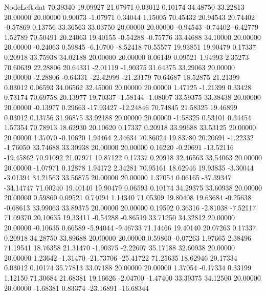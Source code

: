 \begin{filecontents}{NodeLeft.dat}
  70.39340   19.09927   21.07971     0.03012    0.10174   34.48750   33.22813   20.00000   20.00000    0.90073   -1.07971    0.34044    1.15005
  70.45432   20.94543   20.74402    -0.57869    0.13756   33.36563   33.03750   20.00000   20.00000   -0.94543   -0.74402   -6.42779    1.52789
  70.50491   20.24063   19.40155    -0.54288   -0.75776   33.44688   34.10000   20.00000   20.00000   -0.24063    0.59845   -6.10700   -8.52418
  70.55577   19.93851   19.90479     0.17337    0.20918   33.75938   34.02188   20.00000   20.00000    0.06149    0.09521    1.94993    2.35273
  70.60639   22.28806   20.64331    -2.01119   -1.90375   31.64375   33.29063   20.00000   20.00000   -2.28806   -0.64331  -22.42999  -21.23179
  70.64687   18.52875   21.21399     0.03012    0.06593   34.06562   32.45000   20.00000   20.00000    1.47125   -1.21399    0.33428    0.73174
  70.69758   20.13977   19.70337    -1.58144   -1.08007   33.59375   33.38438   20.00000   20.00000   -0.13977    0.29663  -17.93427  -12.24846
  70.74845   21.58325   19.46899     0.03012    0.13756   31.96875   33.92188   20.00000   20.00000   -1.58325    0.53101    0.34454    1.57354
  70.78913   18.62930   20.10620     0.17337    0.20918   33.99688   33.53125   20.00000   20.00000    1.37070   -0.10620    1.94464    2.34634
  70.86024   19.83780   20.20691    -1.22332   -1.76050   33.74688   33.30938   20.00000   20.00000    0.16220   -0.20691  -13.52116  -19.45862
  70.91092   21.07971   19.87122     0.17337    0.20918   32.46563   33.54063   20.00000   20.00000   -1.07971    0.12878    1.94172    2.34281
  70.95161   18.62946   19.93835    -3.30044   -3.01394   34.21563   33.56875   20.00000   20.00000    1.37054    0.06165  -37.39347  -34.14747
  71.00240   19.40140   19.90479     0.06593    0.10174   34.29375   33.60938   20.00000   20.00000    0.59860    0.09521    0.74094    1.14340
  71.05309   19.80408   19.63684    -0.25638   -0.68613   33.99063   33.89375   20.00000   20.00000    0.19592    0.36316   -2.81038   -7.52117
  71.09370   20.10635   19.33411    -0.54288   -0.86519   33.71250   34.32812   20.00000   20.00000   -0.10635    0.66589   -5.94044   -9.46733
  71.14466   19.40140   20.07263     0.17337    0.20918   34.28750   33.89688   20.00000   20.00000    0.59860   -0.07263    1.97665    2.38496
  71.19541   18.76358   21.31470    -1.90375   -2.22607   35.17188   32.60938   20.00000   20.00000    1.23642   -1.31470  -21.73706  -25.41722
  71.25635   18.62946   20.17334     0.03012    0.10174   35.77813   33.07188   20.00000   20.00000    1.37054   -0.17334    0.33199    1.12150
  71.30684   21.68381   19.16626    -2.04700   -1.47400   33.39375   34.12500   20.00000   20.00000   -1.68381    0.83374  -23.16891  -16.68344

\end{filecontents}
